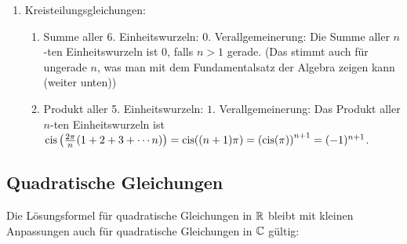 \begin{enumerate}
\begin{center}

    \end{center}

       
        

    \item Kreisteilungsgleichungen:
    \begin{enumerate}
 
        \item Summe aller 6. Einheitswurzeln: \( 0 \). Verallgemeinerung: Die Summe aller \( n \)-ten Einheitswurzeln ist \( 0 \), falls \( n > 1 \) gerade. (Das stimmt auch für ungerade $n$, was man mit dem Fundamentalsatz der Algebra zeigen kann (weiter unten))
        \item Produkt aller 5. Einheitswurzeln: \(  1 \). Verallgemeinerung: Das Produkt aller \( n \)-ten Einheitswurzeln ist \( \mathrm{cis}\left(\frac{2\pi}{n} (1+2+3+\cdots n)\right)= \mathrm{cis}((n+1)\pi) = \left(\mathrm{cis} (\pi)\right)^{n+1} = (-1)^{n+1} \).    \end{enumerate}
\end{enumerate}



















\clearpage
\subsection{Quadratische Gleichungen}
Die Lösungsformel für quadratische Gleichungen in $\mathbb{R}$ bleibt mit kleinen Anpassungen auch für quadratische Gleichungen in $\mathbb{C}$ gültig:

